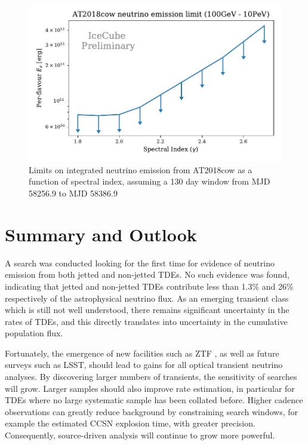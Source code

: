 \documentclass{PoS}
\begin{document}
\begin{figure}[!ht]
	\centering \includegraphics[width=.9\textwidth]{figures/AT2018cow_limit_plot}
	\caption{Limits on integrated neutrino emission from AT2018cow as a function of spectral index, assuming a 130 day window from MJD 58256.9 to MJD 58386.9}
	\label{fig:At2018cow}
\end{figure}

\section{Summary and Outlook}

A search was conducted looking for the first time for evidence of neutrino emission from both jetted and non-jetted TDEs. No such evidence was found, indicating that jetted and non-jetted TDEs contribute less than 1.3\% and 26\% respectively of the astrophysical neutrino flux. As an emerging transient class which is still not well understood, there remains significant uncertainty in the rates of TDEs, and this directly translates into uncertainty in the cumulative population flux. 

Fortunately, the emergence of new facilities such as ZTF \cite{2019PASP..131a8002B}, as well as future surveys such as LSST, should lead to gains for all optical transient neutrino analyses. By discovering larger numbers of transients, the sensitivity of searches will grow. Larger samples should also improve rate estimation, in particular for TDEs where no large systematic sample has been collated before. Higher cadence observations can greatly reduce background by constraining search windows, for example the estimated CCSN explosion time, with greater precision. Consequently, source-driven analysis will continue to grow more powerful.



\end{document}
